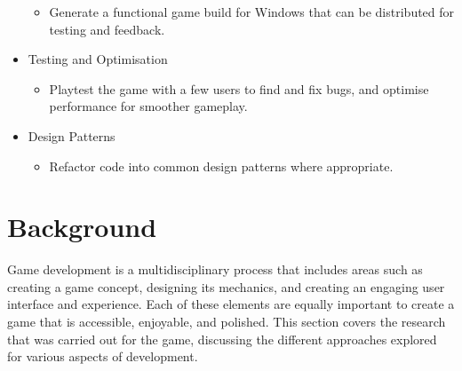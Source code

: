 \documentclass[10pt]{final_report}
\begin{document}
\begin{itemize}
    \begin{itemize}
	\item{Generate a functional game build for Windows that can be distributed for testing and feedback.}
    \end{itemize}
    \item Testing and Optimisation
    \begin{itemize}
	\item{Playtest the game with a few users to find and fix bugs, and optimise performance for smoother gameplay.}
    \end{itemize}
    \item Design Patterns
    \begin{itemize}
	\item{Refactor code into common design patterns where appropriate.}
    \end{itemize}
\end{itemize}

\chapter{Background}
Game development is a multidisciplinary process that includes areas such as creating a game concept, designing its mechanics, and creating an engaging user interface and experience. Each of these elements are equally important to create a game that is accessible, enjoyable, and polished. This section covers the research that was carried out for the game, discussing the different approaches explored for various aspects of development. 
\end{document}
